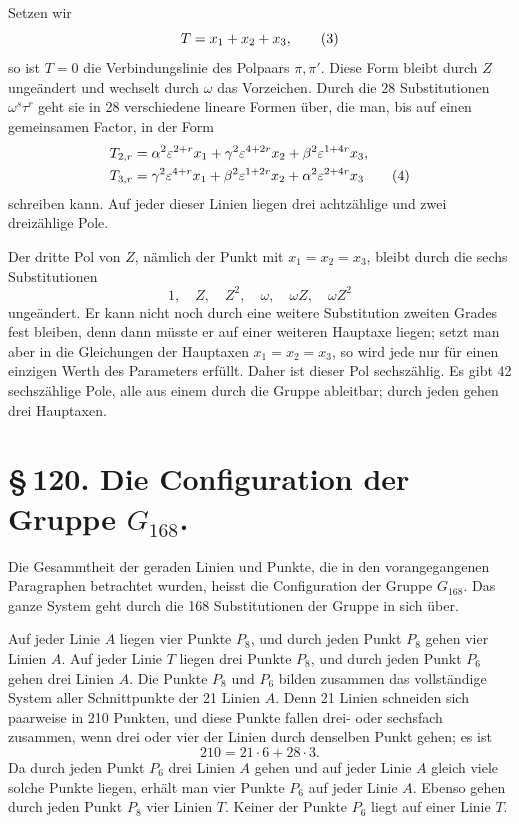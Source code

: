\documentclass[11pt]{article}
\newcommand{\eps}{\varepsilon}
\begin{document}
Setzen wir
\begin{equation}
T=x_1+x_2+x_3,\notag
\tag{3}
\end{equation}
so ist \(T=0\) die Verbindungslinie des Polpaars \(\pi,\pi'\). Diese Form bleibt durch \(Z\) ungeändert und wechselt durch \(\omega\) das Vorzeichen. Durch die 28 Substitutionen \(\omega^s\tau^r\) geht sie in 28 verschiedene lineare Formen über, die man, bis auf einen gemeinsamen Factor, in der Form
\begin{align}
T_{2,r}&=\alpha^2\eps^{2+r}x_1+\gamma^2\eps^{4+2r}x_2+\beta^2\eps^{1+4r}x_3,\notag\\
T_{3,r}&=\gamma^2\eps^{4+r}x_1+\beta^2\eps^{1+2r}x_2+\alpha^2\eps^{2+4r}x_3
\tag{4}
\end{align}
schreiben kann. Auf jeder dieser Linien liegen drei achtzählige und zwei dreizählige Pole.

Der dritte Pol von \(Z\), nämlich der Punkt mit \(x_1=x_2=x_3\), bleibt durch die sechs Substitutionen
\begin{equation}
1,\quad Z,\quad Z^2,\quad \omega,\quad \omega Z,\quad \omega Z^2
\tag{5}
\end{equation}
ungeändert. Er kann nicht noch durch eine weitere Substitution zweiten Grades fest bleiben, denn dann müsste er auf einer weiteren Hauptaxe liegen; setzt man aber in die Gleichungen der Hauptaxen \(x_1=x_2=x_3\), so wird jede nur für einen einzigen Werth des Parameters erfüllt. Daher ist dieser Pol sechszählig. Es gibt 42 sechszählige Pole, alle aus einem durch die Gruppe ableitbar; durch jeden gehen drei Hauptaxen.

\section*{\S\,120. Die Configuration der Gruppe \(G_{168}\).}

Die Gesammtheit der geraden Linien und Punkte, die in den vorangegangenen Paragraphen betrachtet wurden, heisst die Configuration der Gruppe \(G_{168}\). Das ganze System geht durch die 168 Substitutionen der Gruppe in sich über.

Auf jeder Linie \(A\) liegen vier Punkte \(P_8\), und durch jeden Punkt \(P_8\) gehen vier Linien \(A\). Auf jeder Linie \(T\) liegen drei Punkte \(P_8\), und durch jeden Punkt \(P_6\) gehen drei Linien \(A\). Die Punkte \(P_8\) und \(P_6\) bilden zusammen das vollständige System aller Schnittpunkte der 21 Linien \(A\). Denn 21 Linien schneiden sich paarweise in 210 Punkten, und diese Punkte fallen drei- oder sechsfach zusammen, wenn drei oder vier der Linien durch denselben Punkt gehen; es ist
\begin{equation}
210=21\cdot6+28\cdot3.
\tag{1}
\end{equation}
Da durch jeden Punkt \(P_6\) drei Linien \(A\) gehen und auf jeder Linie \(A\) gleich viele solche Punkte liegen, erhält man vier Punkte \(P_6\) auf jeder Linie \(A\). Ebenso gehen durch jeden Punkt \(P_8\) vier Linien \(T\). Keiner der Punkte \(P_6\) liegt auf einer Linie \(T\).
\end{document}
